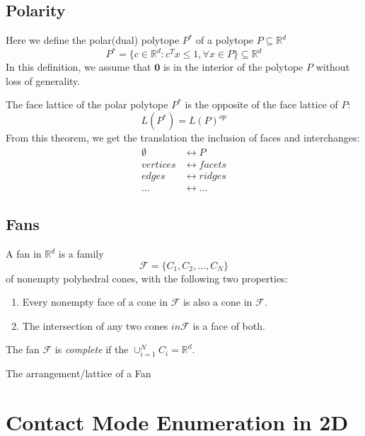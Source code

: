 \documentclass[conference]{IEEEtran}
\begin{document}
\subsection{Polarity}
Here we define the polar(dual) polytope $P^*$ of a polytope $P \subseteq \mathbb{R}^d$ 
\begin{equation}
    P^* = \{c \in \mathbb{R}^d: c^T x \leq 1, \forall x \in P\} \subseteq \mathbb{R}^d
\end{equation}
In this definition, we assume that $\mathbf{0}$ is in the interior of the polytope $P$ without loss of generality.   

The face lattice of the polar polytope $P^*$ is the opposite of the face lattice of $P$:
\begin{equation}
    L(P^*) = L(P)^{op}
\end{equation}
From this theorem, we get the translation the inclusion of faces and interchanges:
\begin{align}
    \emptyset &\longleftrightarrow P \\
    vertices &\longleftrightarrow facets \\
    edges &\longleftrightarrow ridges \\
    ... &\longleftrightarrow ...
\end{align}

\subsection{Fans}
A fan in $\mathbb{R}^d$ is a family 
\begin{equation}
    \mathcal{F} = \{C_1, C_2, \hdots, C_N\}
\end{equation}
of nonempty polyhedral cones, with the following two properties:
\begin{enumerate}
    \item Every nonempty face of a cone in $\mathcal{F}$ is also a cone in $\mathcal{F}$.
    \item The intersection of any two cones $in \mathcal{F}$ is a face of both.
\end{enumerate}
The fan $\mathcal{F}$ is \textit{complete} if the $\cup_{i=1}^N C_i = \mathbb{R}^d$.

The arrangement/lattice of a Fan

\section{Contact Mode Enumeration in 2D}
\end{document}
